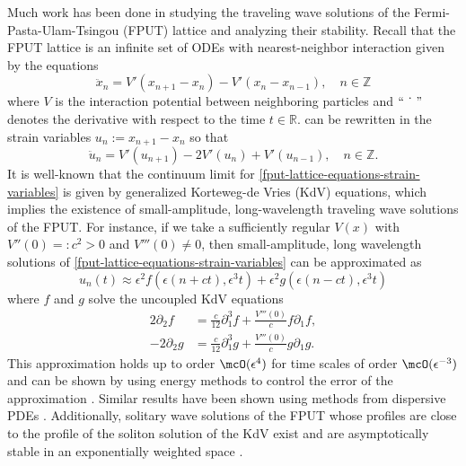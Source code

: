 \documentclass[oneside,reqno]{amsart}
\newcommand{\Z}{\mathbb{Z}}
\begin{document}
Much work has been done in studying the traveling wave solutions of the Fermi-Pasta-Ulam-Tsingou (FPUT) lattice and analyzing their stability. Recall that the FPUT lattice is an infinite set of ODEs with nearest-neighbor interaction given by the equations
\begin{equation}\label{fput-lattice-odes}
	\ddot x_n = V'(x_{n+1} - x_n) - V'(x_n - x_{n-1}), \quad n \in \Z
\end{equation}
where \(V\) is the interaction potential between neighboring particles and \(``\dot{\hspace{1em}}"\) denotes the derivative with respect to the time \(t\in \mathbb{R}\).  can be rewritten in the strain variables \(u_n := x_{n+1} - x_n\) so that
\begin{equation}\label{fput-lattice-equations-strain-variables}
	\ddot{u}_n = V'(u_{n+1}) - 2 V'(u_n) + V'(u_{n-1}), \quad n \in \Z.
\end{equation}
It is well-known that the continuum limit for \cref{fput-lattice-equations-strain-variables} is given by generalized Korteweg-de Vries (KdV) equations, which implies the existence of small-amplitude, long-wavelength traveling wave solutions of the FPUT. For instance, if we take a sufficiently regular \(V(x)\) with \(V''(0) =: c^2 > 0\) and \(V'''(0) \neq 0 \), then small-amplitude, long wavelength solutions of \cref{fput-lattice-equations-strain-variables} can be approximated as
\begin{equation*}
	u_n(t) \approx \epsilon^2 f(\epsilon(n + ct), \epsilon^3 t) + \epsilon^2 g(\epsilon(n-ct), \epsilon^3t)
\end{equation*}
where \(f\) and \(g\) solve the uncoupled KdV equations
\begin{align*}
	2 \partial_2 f &= \frac{ c} {12} \partial_1^3 f+ \frac{V'''(0)}{c } f \partial_1 f, \\
	-2 \partial_2 g &= \frac{ c} {12} \partial_1^3 g+ \frac{V'''(0)}{c } g \partial_1 g.
\end{align*}
This approximation holds up to order \(\mcO(\epsilon^4)\) for time scales of order \(\mcO(\epsilon^{-3})\) and can be shown by using energy methods to control the error of the approximation \cite{schneider2000counter}. Similar results have been shown using methods from dispersive PDEs \cite{hong2021korteweg}. Additionally, solitary wave solutions of the FPUT whose profiles are close to the profile of the soliton solution of the KdV exist and are asymptotically stable in an exponentially weighted space \cites{friesecke1999solitary,friesecke2002solitary,friesecke2003solitary,friesecke2004solitary}. 
\end{document}
